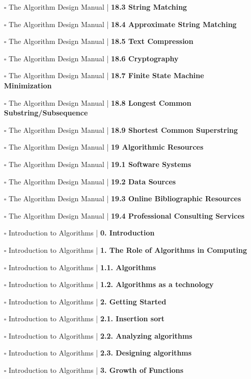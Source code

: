 \documentclass[a4, landscape, 12pt]{article}
\newcommand{\checkbox}{$\square$}%
\begin{document}
\begin{itemize}
{}
\item [\checkbox]  The Algorithm Design Manual | \textbf{ 18.3 String Matching
}
\item [\checkbox]  The Algorithm Design Manual | \textbf{ 18.4 Approximate String Matching
}
\item [\checkbox]  The Algorithm Design Manual | \textbf{ 18.5 Text Compression
}
\item [\checkbox]  The Algorithm Design Manual | \textbf{ 18.6 Cryptography
}
\item [\checkbox]  The Algorithm Design Manual | \textbf{ 18.7 Finite State Machine Minimization
}
\item [\checkbox]  The Algorithm Design Manual | \textbf{ 18.8 Longest Common Substring/Subsequence
}
\item [\checkbox]  The Algorithm Design Manual | \textbf{ 18.9 Shortest Common Superstring
}
\item [\checkbox]  The Algorithm Design Manual | \textbf{ 19 Algorithmic Resources
}
\item [\checkbox]  The Algorithm Design Manual | \textbf{ 19.1 Software Systems
}
\item [\checkbox]  The Algorithm Design Manual | \textbf{ 19.2 Data Sources
}
\item [\checkbox]  The Algorithm Design Manual | \textbf{ 19.3 Online Bibliographic Resources
}
\item [\checkbox]  The Algorithm Design Manual | \textbf{ 19.4 Professional Consulting Services
}
\item [\checkbox]  Introduction to Algorithms | \textbf{ 0. Introduction
}
\item [\checkbox]  Introduction to Algorithms | \textbf{ 1. The Role of Algorithms in Computing
}
\item [\checkbox]  Introduction to Algorithms | \textbf{ 1.1. Algorithms
}
\item [\checkbox]  Introduction to Algorithms | \textbf{ 1.2. Algorithms as a technology
}
\item [\checkbox]  Introduction to Algorithms | \textbf{ 2. Getting Started
}
\item [\checkbox]  Introduction to Algorithms | \textbf{ 2.1. Insertion sort
}
\item [\checkbox]  Introduction to Algorithms | \textbf{ 2.2. Analyzing algorithms
}
\item [\checkbox]  Introduction to Algorithms | \textbf{ 2.3. Designing algorithms
}
\item [\checkbox]  Introduction to Algorithms | \textbf{ 3. Growth of Functions
}
\end{itemize}
\end{document}

